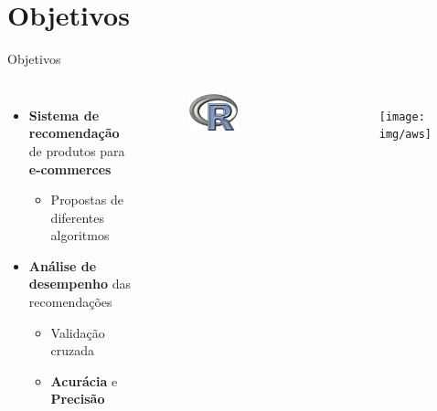 \section[Objetivos]{Objetivos}
\begin{frame}{Objetivos}
\begin{columns}[c] 
\begin{itemize}
	\item \textbf{Sistema de recomendação} de produtos para \textbf{e-commerces}
	\begin{itemize}
		\item Propostas de diferentes algoritmos
	\end{itemize}
	\item \textbf{Análise de desempenho} das recomendações
	\begin{itemize}
		\item Validação cruzada
		\item \textbf{Acurácia} e \textbf{Precisão} 
	\end{itemize}
\end{itemize}

\begin{figure}[ht]
    \begin{center}
    \includegraphics[width=0.5\textwidth]{img/r}
    \end{center}
\end{figure}

\begin{figure}[ht]
    \begin{center}
    \texttt{[image: img/aws]}
    \end{center}
\end{figure}

\end{columns}
\end{frame}
